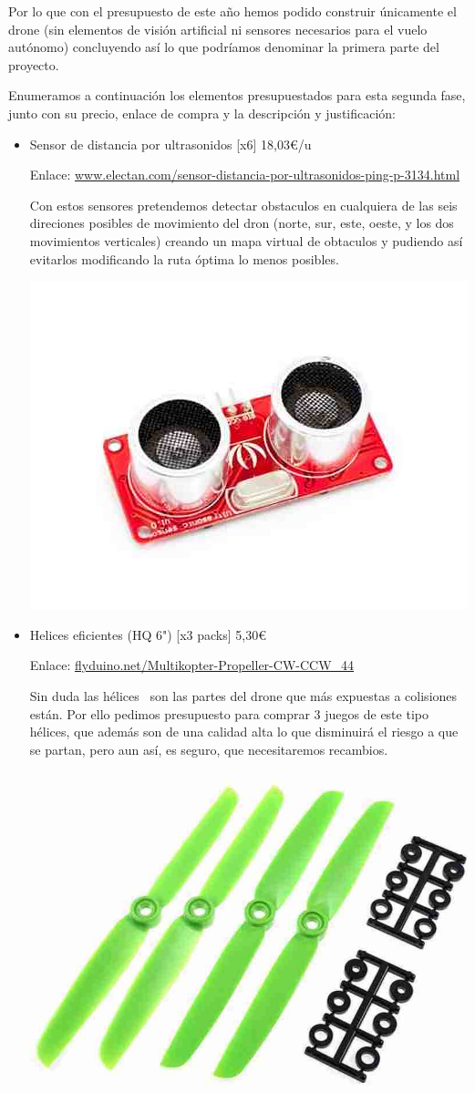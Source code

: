 \documentclass[12pt,twoside]{report}
\begin{document}
Por lo que con el presupuesto de este año hemos podido construir únicamente el drone (sin elementos de visión artificial ni sensores necesarios para el vuelo autónomo) concluyendo así lo que podríamos denominar la primera parte del proyecto.

Enumeramos a continuación los elementos presupuestados para esta segunda fase, junto con su precio, enlace de compra y la descripción y justificación:

\begin{itemize}
\item  Sensor de distancia por ultrasonidos [x6] 18,03\euro{}/u

Enlace: \url{www.electan.com/sensor-distancia-por-ultrasonidos-ping-p-3134.html}

Con estos sensores pretendemos detectar obstaculos en cualquiera de las seis direciones posibles de movimiento del dron (norte, sur, este, oeste, y los dos movimientos verticales) creando un mapa virtual de obtaculos y pudiendo así evitarlos modificando la ruta óptima lo menos posibles.

\centerline{
    \includegraphics[width=0.45\linewidth]{fotos/sensor_ultra.jpg}}

\item Helices eficientes (HQ 6") [x3 packs] 5,30\euro{}

Enlace: \url{flyduino.net/Multikopter-Propeller-CW-CCW_44}

Sin duda las hélices  son las partes del drone que más expuestas a colisiones están. Por ello pedimos presupuesto para comprar 3 juegos de este tipo hélices, que además son de una calidad alta lo que disminuirá el riesgo a que se partan, pero aun así, es seguro, que necesitaremos recambios.

\centerline{
    \includegraphics[width=0.45\linewidth]{fotos/helices.jpg}}


\end{itemize}
\end{document}
